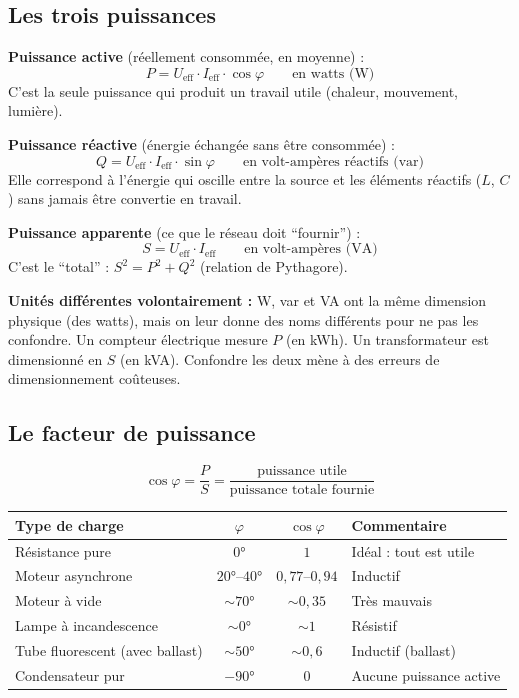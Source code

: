 \documentclass[12pt,a4paper,twoside]{book}
\begin{document}
\subsection{Les trois puissances}

\begin{formule}
\textbf{Puissance active} (réellement consommée, en moyenne) :
\[
\boxed{P = U_{\text{eff}} \cdot I_{\text{eff}} \cdot \cos\varphi} \qquad \text{en watts (W)}
\]
C'est la seule puissance qui produit un travail utile (chaleur, mouvement, lumière).

\vspace{0.3cm}
\textbf{Puissance réactive} (énergie échangée sans être consommée) :
\[
\boxed{Q = U_{\text{eff}} \cdot I_{\text{eff}} \cdot \sin\varphi} \qquad \text{en volt-ampères réactifs (var)}
\]
Elle correspond à l'énergie qui oscille entre la source et les éléments réactifs ($L$, $C$) sans jamais être convertie en travail.

\vspace{0.3cm}
\textbf{Puissance apparente} (ce que le réseau doit ``fournir'') :
\[
\boxed{S = U_{\text{eff}} \cdot I_{\text{eff}}} \qquad \text{en volt-ampères (VA)}
\]
C'est le ``total'' : $\boxed{S^2 = P^2 + Q^2}$ (relation de Pythagore).
\end{formule}

\begin{attention}
\textbf{Unités différentes volontairement :} W, var et VA ont la même dimension physique (des watts), mais on leur donne des noms différents pour ne pas les confondre. Un compteur électrique mesure $P$ (en kWh). Un transformateur est dimensionné en $S$ (en kVA). Confondre les deux mène à des erreurs de dimensionnement coûteuses.
\end{attention}

\subsection{Le facteur de puissance}

\begin{formule}
\[
\boxed{\cos\varphi = \frac{P}{S} = \frac{\text{puissance utile}}{\text{puissance totale fournie}}}
\]
\end{formule}

\begin{center}
\begin{tabular}{lccl}
\toprule
\textbf{Type de charge} & $\varphi$ & $\cos\varphi$ & \textbf{Commentaire} \\
\midrule
Résistance pure & $0°$ & $1$ & Idéal : tout est utile \\
Moteur asynchrone & $20°$--$40°$ & $0{,}77$--$0{,}94$ & Inductif \\
Moteur à vide & $\sim 70°$ & $\sim 0{,}35$ & Très mauvais \\
Lampe à incandescence & $\sim 0°$ & $\sim 1$ & Résistif \\
Tube fluorescent (avec ballast) & $\sim 50°$ & $\sim 0{,}6$ & Inductif (ballast) \\
Condensateur pur & $-90°$ & $0$ & Aucune puissance active \\
\bottomrule
\end{tabular}
\end{center}
\end{document}
